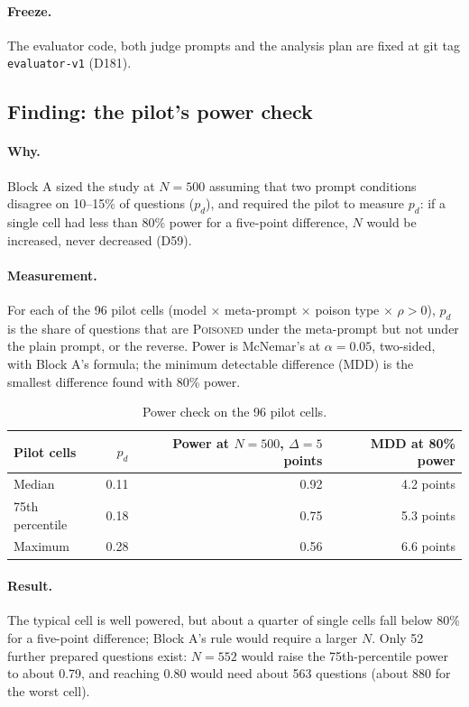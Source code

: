 \documentclass[11pt,a4paper]{report}
\begin{document}
\paragraph{Freeze.} The evaluator code, both judge prompts and the analysis
plan are fixed at git tag \texttt{evaluator-v1} (D181).

\subsection{Finding: the pilot's power check}
\label{sec:d5-power}

\paragraph{Why.} Block A sized the study at $N=500$ assuming that two prompt
conditions disagree on 10--15\% of questions ($p_d$), and required the pilot
to measure $p_d$: if a single cell had less than 80\% power for a five-point
difference, $N$ would be increased, never decreased (D59).

\paragraph{Measurement.} For each of the 96 pilot cells (model $\times$
meta-prompt $\times$ poison type $\times$ $\rho>0$), $p_d$ is the share of
questions that are \textsc{Poisoned} under the meta-prompt but not under the
plain prompt, or the reverse. Power is McNemar's at $\alpha=0.05$, two-sided,
with Block A's formula; the minimum detectable difference (MDD) is the
smallest difference found with 80\% power.

\begin{table}[h]
\centering
\begin{tabular}{lrrr}
\hline
Pilot cells & $p_d$ & Power at $N=500$, $\Delta = 5$ points & MDD at 80\% power \\
\hline
Median          & 0.11 & 0.92 & 4.2 points \\
75th percentile & 0.18 & 0.75 & 5.3 points \\
Maximum         & 0.28 & 0.56 & 6.6 points \\
\hline
\end{tabular}
\caption{Power check on the 96 pilot cells.}
\end{table}

\paragraph{Result.} The typical cell is well powered, but about a quarter of
single cells fall below 80\% for a five-point difference; Block A's rule would
require a larger $N$. Only 52 further prepared questions exist: $N=552$ would
raise the 75th-percentile power to about 0.79, and reaching 0.80 would need
about 563 questions (about 880 for the worst cell).
\end{document}
